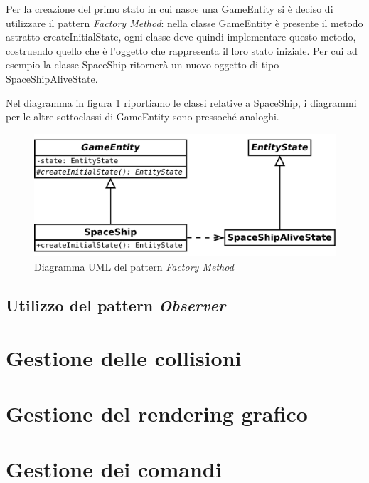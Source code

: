 \documentclass[a4paper,12pt]{article}
\begin{document}
Per la creazione del primo stato in cui nasce una \textsf{GameEntity} si \`e deciso di utilizzare il pattern \emph{Factory Method}: nella classe \textsf{GameEntity} \`e presente il metodo astratto \textsf{createInitialState}, ogni classe deve quindi implementare questo metodo, costruendo quello che \`e l'oggetto che rappresenta il loro stato iniziale. Per cui ad esempio la classe \textsf{SpaceShip} ritorner\`a un nuovo oggetto di tipo \textsf{SpaceShipAliveState}.

Nel diagramma in figura \ref{img:FactoryMethod} riportiamo le classi relative a \textsf{SpaceShip}, i diagrammi per le altre sottoclassi di \textsf{GameEntity} sono pressoch\'e analoghi.

\begin{figure}[h]
\centering
\includegraphics[width=15cm]{FactoryMethod.pdf}
\caption{Diagramma UML del pattern \emph{Factory Method}}
\label{img:FactoryMethod}
\end{figure}

\subsection{Utilizzo del pattern \emph{Observer}}

\section{Gestione delle collisioni}
\label{sec:collisioni}

\section{Gestione del rendering grafico}
\label{sec:graphics}

\section{Gestione dei comandi}
\label{sec:comandi}
\end{document}
